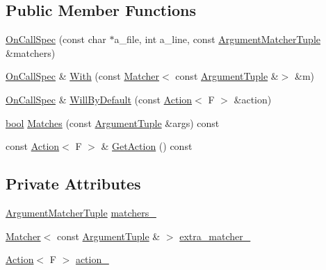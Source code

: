 \subsection*{Public Member Functions}
\begin{DoxyCompactItemize}
\item 
\hyperlink{classtesting_1_1internal_1_1OnCallSpec_ac7077e8162a10714e463b64a3cc7d054}{On\+Call\+Spec} (const char $\ast$a\+\_\+file, int a\+\_\+line, const \hyperlink{classtesting_1_1internal_1_1OnCallSpec_a3240f159f0a9d8cda208bc256da35074}{Argument\+Matcher\+Tuple} \&matchers)
\item 
\hyperlink{classtesting_1_1internal_1_1OnCallSpec}{On\+Call\+Spec} \& \hyperlink{classtesting_1_1internal_1_1OnCallSpec_a4d9152c0f74245670a1222aae2262d5e}{With} (const \hyperlink{classtesting_1_1Matcher}{Matcher}$<$ const \hyperlink{classtesting_1_1internal_1_1OnCallSpec_a70ffab8b915b7b48a90f5ce256da806f}{Argument\+Tuple} \&$>$ \&m)
\item 
\hyperlink{classtesting_1_1internal_1_1OnCallSpec}{On\+Call\+Spec} \& \hyperlink{classtesting_1_1internal_1_1OnCallSpec_a1c6303bf46983f20f4d2a61752fa8663}{Will\+By\+Default} (const \hyperlink{classtesting_1_1Action}{Action}$<$ F $>$ \&action)
\item 
\hyperlink{classbool}{bool} \hyperlink{classtesting_1_1internal_1_1OnCallSpec_a8113d1ec5775715637a87875dee6cc68}{Matches} (const \hyperlink{classtesting_1_1internal_1_1OnCallSpec_a70ffab8b915b7b48a90f5ce256da806f}{Argument\+Tuple} \&args) const
\item 
const \hyperlink{classtesting_1_1Action}{Action}$<$ F $>$ \& \hyperlink{classtesting_1_1internal_1_1OnCallSpec_a3ef8e41380326823fb5b701f3c52cdb6}{Get\+Action} () const
\end{DoxyCompactItemize}
\subsection*{Private Attributes}
\begin{DoxyCompactItemize}
\item 
\hyperlink{classtesting_1_1internal_1_1OnCallSpec_a3240f159f0a9d8cda208bc256da35074}{Argument\+Matcher\+Tuple} \hyperlink{classtesting_1_1internal_1_1OnCallSpec_a3938ebe6cb9bc385956358e354a67673}{matchers\+\_\+}
\item 
\hyperlink{classtesting_1_1Matcher}{Matcher}$<$ const \hyperlink{classtesting_1_1internal_1_1OnCallSpec_a70ffab8b915b7b48a90f5ce256da806f}{Argument\+Tuple} \& $>$ \hyperlink{classtesting_1_1internal_1_1OnCallSpec_ab9c4a32626e40be4b40824815128f099}{extra\+\_\+matcher\+\_\+}
\item 
\hyperlink{classtesting_1_1Action}{Action}$<$ F $>$ \hyperlink{classtesting_1_1internal_1_1OnCallSpec_a5868fd7eb5e314e9aef160ebfc9bf834}{action\+\_\+}
\end{DoxyCompactItemize}

